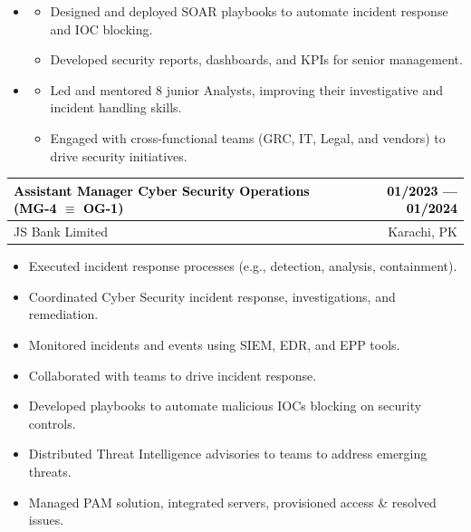 \documentclass{resume}
\begin{document}
\begin{itemize}
\item {}
\begin{itemize}
\item Designed and deployed SOAR playbooks to automate incident response and IOC blocking.  
\item Developed security reports, dashboards, and KPIs for senior management. 
\end{itemize}
\end{itemize}
\begin{itemize}
\item {}
\begin{itemize}
\item Led and mentored 8 junior Analysts, improving their investigative and incident handling skills.  
\item Engaged with cross-functional teams (GRC, IT, Legal, and vendors) to drive security initiatives.  
\end{itemize}
\end{itemize}
 \vspace{-0.2cm} 
\divider


\begin{tabularx}{\linewidth}{|X|r|}
    \hline
    
    \cellcolor{lightblue}\textcolor{black}{Assistant Manager Cyber Security Operations \space (MG-4 $\equiv$ OG-1)} & 
    \cellcolor{lightblue}\textcolor{black}{01/2023 --- 01/2024} \\
    \hline
    
    JS Bank Limited & Karachi, PK\\
    \hline
\end{tabularx}
\begin{itemize}
\item {} Executed incident response processes (e.g., detection, analysis, containment).
\item {} Coordinated Cyber Security incident response, investigations, and remediation.
\item {} Monitored incidents and events using SIEM, EDR, and EPP tools.
\item {} Collaborated with teams to drive incident response.
\item {} Developed playbooks to automate malicious IOCs blocking on security controls.
\item {} Distributed Threat Intelligence advisories to teams to address emerging threats.
\item {} Managed PAM solution, integrated servers, provisioned access \& resolved issues.
\end{itemize}
 \vspace{-0.2cm} 
\divider
\end{document}

